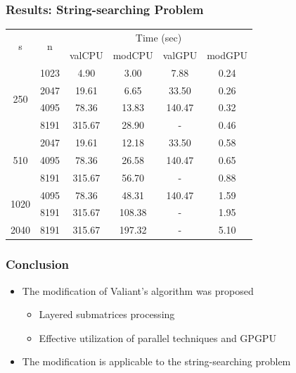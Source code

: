 \documentclass[xcolor=table]{beamer}
\begin{document}
\begin{frame}
\frametitle{Results: String-searching Problem}
    
    \begin{table}
    
    \begin{center}
    \label{tbl3}
        \begin{tabular}{ ||c||c||c|c||c|c|| } 
        \hline
        \multirow{2}{*}{s}& \multirow{2}{*}{n} & \multicolumn{4}{c||}{Time (sec)}\\
        & & valCPU & modCPU & valGPU & modGPU \\
        \hline
        \multirow{4}{*}{250} & 1023 & 4.90 & 3.00 & 7.88 & 0.24 \\ 
        & 2047 & 19.61 & 6.65 & 33.50 & 0.26\\ 
        & 4095 & 78.36 & 13.83 & 140.47 & 0.32\\ 
        & 8191 & 315.67 & 28.90 & - & 0.46\\ 
        \hline
        \multirow{3}{*}{510} & 2047 & 19.61 & 12.18 & 33.50 & 0.58\\
        & 4095 & 78.36 & 26.58 & 140.47 & 0.65\\
        & 8191 & 315.67 & 56.70 & -  & 0.88\\ 
        \hline
        \multirow{2}{*}{1020} & 4095 & 78.36 & 48.31 & 140.47 & 1.59 \\
        & 8191 & 315.67 & 108.38 & - & 1.95\\ 
        \hline
        2040 & 8191 & 315.67 & 197.32 & - & 5.10\\ 
        \hline
        \end{tabular}
    \end{center}
    
    \end{table}

\end{frame}


\begin{frame}[fragile] \frametitle{Conclusion}
    \begin{itemize}
        \item The modification of Valiant's algorithm was proposed
        \begin{itemize}
            \item Layered submatrices processing
            \item Effective utilization of parallel techniques and GPGPU
        \end{itemize}
        \item The modification is applicable to the string-searching problem
    \end{itemize}
\end{frame}
\end{document}
